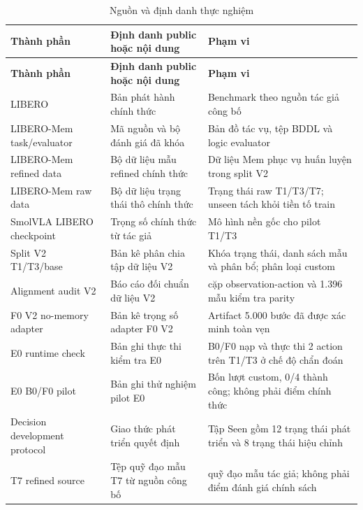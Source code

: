 \begingroup\footnotesize\setlength{\tabcolsep}{3pt}\renewcommand{\arraystretch}{1.05}
\begin{longtable}{|>{\raggedright\arraybackslash}p{}|>{\raggedright\arraybackslash}p{}|>{\raggedright\arraybackslash}p{}|}
\caption{Nguồn và định danh thực nghiệm}\label{tab:public-provenance}\\
\hline
\textbf{Thành phần} & \textbf{Định danh public hoặc nội dung} & \textbf{Phạm vi} \\ \hline
\endfirsthead
\hline
\textbf{Thành phần} & \textbf{Định danh public hoặc nội dung} & \textbf{Phạm vi} \\ \hline
\endhead
\hline\endfoot
LIBERO & Bản phát hành chính thức \cite{liberoSource} & Benchmark theo nguồn tác giả công bố \\ \hline
LIBERO-Mem task/evaluator & Mã nguồn và bộ đánh giá đã khóa \cite{liberomemSource} & Bản đồ tác vụ, tệp BDDL và logic evaluator \\ \hline
LIBERO-Mem refined data & Bộ dữ liệu mẫu refined chính thức \cite{liberomemData} & Dữ liệu Mem phục vụ huấn luyện trong split V2 \\ \hline
LIBERO-Mem raw data & Bộ dữ liệu trạng thái thô chính thức \cite{liberomemRawData} & Trạng thái raw T1/T3/T7; unseen tách khỏi tiền tố train \\ \hline
SmolVLA LIBERO checkpoint & Trọng số chính thức từ tác giả \cite{smolvlaCheckpoint} & Mô hình nền gốc cho pilot T1/T3 \\ \hline
Split V2 T1/T3/base & Bản kê phân chia tập dữ liệu V2 & Khóa trạng thái, danh sách mẫu và phân bổ; phân loại custom \\ \hline
Alignment audit V2 & Báo cáo đối chuẩn dữ liệu V2 & 180.447 cặp observation-action và 1.396 mẫu kiểm tra parity \\ \hline
F0 V2 no-memory adapter & Bản kê trọng số adapter F0 V2 & Artifact 5.000 bước đã được xác minh toàn vẹn \\ \hline
E0 runtime check & Bản ghi thực thi kiểm tra E0 & B0/F0 nạp và thực thi 2 action trên T1/T3 ở chế độ chẩn đoán \\ \hline
E0 B0/F0 pilot & Bản ghi thử nghiệm pilot E0 & Bốn lượt custom, 0/4 thành công; không phải điểm chính thức \\ \hline
Decision development protocol & Giao thức phát triển quyết định & Tập Seen gồm 12 trạng thái phát triển và 8 trạng thái hiệu chỉnh \\ \hline
T7 refined source & Tệp quỹ đạo mẫu T7 từ nguồn công bố & 88 quỹ đạo mẫu tác giả; không phải điểm đánh giá chính sách \\ \hline

\end{longtable}
